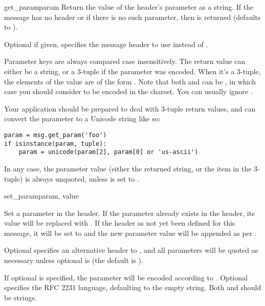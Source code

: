 \begin{methoddesc}[Message]{get_param}{param}
Return the value of the  header's parameter
 as a string.  If the message has no 
header or if there is no such parameter, then  is
returned (defaults to ).

Optional  if given, specifies the message header to use
instead of .

Parameter keys are always compared case insensitively.  The return
value can either be a string, or a 3-tuple if the parameter was
 encoded.  When it's a 3-tuple, the elements of the value are of
the form .  Note that both  and
 can be , in which case you should consider
 to be encoded in the  charset.  You can
usually ignore .

Your application should be prepared to deal with 3-tuple return
values, and can convert the parameter to a Unicode string like so:

\begin{verbatim}
param = msg.get_param('foo')
if isinstance(param, tuple):
    param = unicode(param[2], param[0] or 'us-ascii')
\end{verbatim}

In any case, the parameter value (either the returned string, or the
 item in the 3-tuple) is always unquoted, unless
 is set to .

\end{methoddesc}

\begin{methoddesc}[Message]{set_param}{param, value}

Set a parameter in the  header.  If the
parameter already exists in the header, its value will be replaced
with .  If the  header as not yet
been defined for this message, it will be set to 
and the new parameter value will be appended as per .

Optional  specifies an alternative header to
, and all parameters will be quoted as
necessary unless optional  is  (the default
is ).

If optional  is specified, the parameter will be encoded
according to . Optional  specifies the RFC
2231 language, defaulting to the empty string.  Both  and
 should be strings.

\end{methoddesc}

